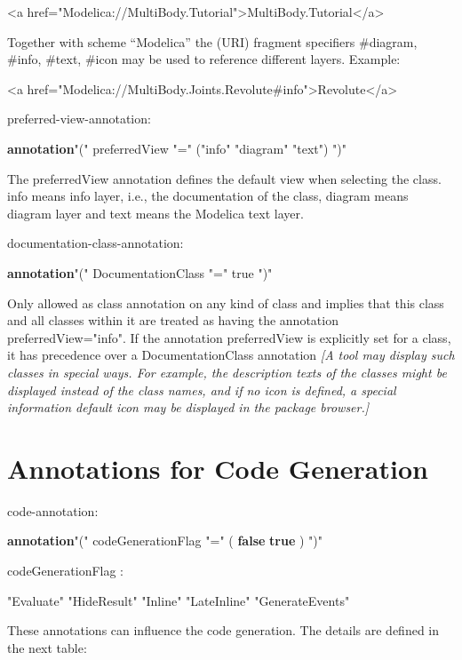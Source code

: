 \documentclass[10pt,a4paper]{report}
\def\doublelabel#1{\label{#1}\hypertarget{#1}{}}
\begin{document}
\textless{}a
href="Modelica://MultiBody.Tutorial"\textgreater{}MultiBody.Tutorial\textless{}/a\textgreater{}

Together with scheme ``Modelica'' the (URI) fragment specifiers
\#diagram, \#info, \#text, \#icon may be used to reference different
layers. Example:

\textless{}a
href="Modelica://MultiBody.Joints.Revolute\#info"\textgreater{}Revolute\textless{}/a\textgreater{}

preferred-view-annotation:

\textbf{annotation}"(" preferredView "=" ("info" \textbar{} "diagram"
\textbar{} "text") ")"

The preferredView annotation defines the default view when selecting the
class. info means info layer, i.e., the documentation of the class,
diagram means diagram layer and text means the Modelica text layer.

documentation-class-annotation:

\textbf{annotation}"(" DocumentationClass "=" true ")"

Only allowed as class annotation on any kind of class and implies that
this class and all classes within it are treated as having the
annotation preferredView="info". If the annotation preferredView is
explicitly set for a class, it has precedence over a DocumentationClass
annotation \emph{{[}A tool may display such classes in special ways. For
example, the description texts of the classes might be displayed instead
of the class names, and if no icon is defined, a special information
default icon may be displayed in the package browser.{]}}

\section{Annotations for Code Generation}\doublelabel{annotations-for-code-generation}

code-annotation:

\textbf{annotation}"(" codeGenerationFlag "=" ( \textbf{false}
\textbar{} \textbf{true} ) ")"

codeGenerationFlag :

"Evaluate" \textbar{} "HideResult" \textbar{} "Inline" \textbar{}
"LateInline" \textbar{} "GenerateEvents"

These annotations can influence the code generation. The details are
defined in the next table:
\end{document}
